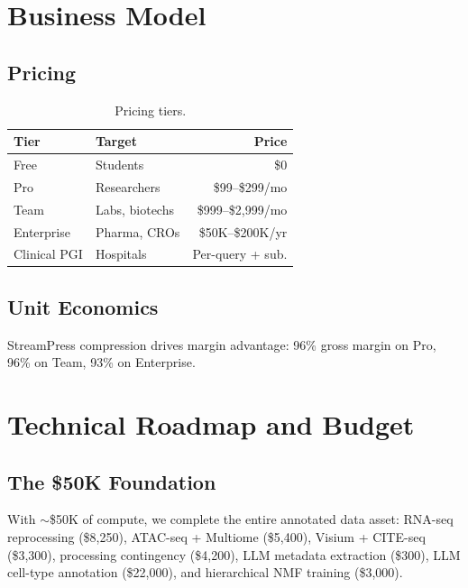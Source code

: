 \documentclass[10pt,twocolumn,letterpaper]{article}
\begin{document}
\section{Business Model}
\label{sec:business}

\subsection{Pricing}

\begin{table}[h]
\centering
\small
\begin{tabular}{@{}llr@{}}
\toprule
\textbf{Tier} & \textbf{Target} & \textbf{Price} \\
\midrule
Free & Students & \$0 \\
Pro & Researchers & \$99--\$299/mo \\
Team & Labs, biotechs & \$999--\$2,999/mo \\
Enterprise & Pharma, CROs & \$50K--\$200K/yr \\
Clinical PGI & Hospitals & Per-query + sub. \\
\bottomrule
\end{tabular}
\caption{Pricing tiers.}
\label{tab:pricing}
\end{table}

\subsection{Unit Economics}

StreamPress compression drives margin advantage: 96\% gross margin on Pro,
96\% on Team, 93\% on Enterprise.

\section{Technical Roadmap and Budget}
\label{sec:roadmap}

\subsection{The \$50K Foundation}

With $\sim$\$50K of compute, we complete the entire annotated data asset:
RNA-seq reprocessing (\$8,250), ATAC-seq + Multiome (\$5,400), Visium + CITE-seq
(\$3,300), processing contingency (\$4,200), LLM metadata extraction (\$300),
LLM cell-type annotation (\$22,000), and hierarchical NMF training (\$3,000).
\end{document}
